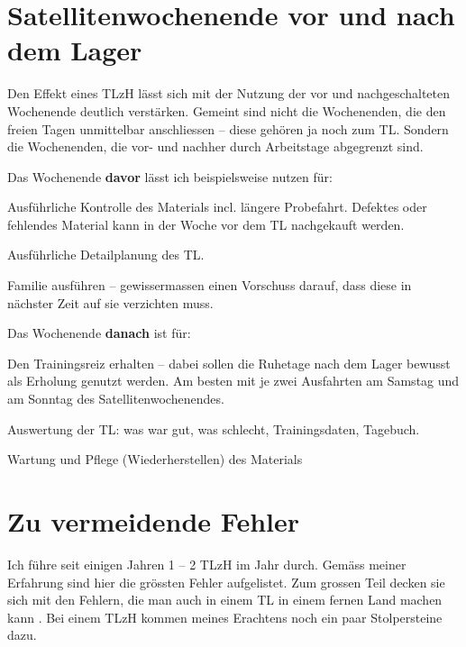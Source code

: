 \documentclass[a4paper,DIV13,BCOR0cm,draft=TRUE]{scrartcl}
\newcommand{\tlzh}{TLzH}
\begin{document}
\section{Satellitenwochenende vor und nach dem Lager}
\label{sec:satellitenwochenende}

Den Effekt eines \tlzh{} lässt sich mit der Nutzung der vor und nachgeschalteten Wochenende deutlich verstärken.
Gemeint sind nicht die Wochenenden, die den freien Tagen unmittelbar anschliessen -- diese gehören ja noch zum TL.
Sondern die Wochenenden, die vor- und nachher durch Arbeitstage abgegrenzt sind.

Das Wochenende \textbf{davor} lässt ich beispielsweise nutzen für:
\begin{itemize*}
  \item Ausführliche Kontrolle des Materials incl. längere Probefahrt.
    Defektes oder fehlendes Material kann in der Woche vor dem TL nachgekauft werden.
  \item Ausführliche Detailplanung des TL.
  \item Familie ausführen -- gewissermassen einen Vorschuss darauf, dass diese in nächster Zeit auf sie verzichten muss.
\end{itemize*}

Das Wochenende \textbf{danach} ist für:

\begin{itemize*}
  \item Den Trainingsreiz erhalten -- dabei sollen die Ruhetage nach dem Lager bewusst als Erholung genutzt werden.
    Am besten mit je zwei Ausfahrten am Samstag und am Sonntag des Satellitenwochenendes.
  \item Auswertung der TL: was war gut, was schlecht, Trainingsdaten, Tagebuch.
  \item Wartung und Pflege (Wiederherstellen) des Materials
\end{itemize*}


\section{Zu vermeidende Fehler}
\label{sec:zu-vermeidende-fehler}

Ich führe seit einigen Jahren 1 -- 2 \tlzh{} im Jahr durch.
Gemäss meiner Erfahrung sind hier die grössten Fehler aufgelistet.
Zum grossen Teil decken sie sich mit den Fehlern, die man auch in einem TL in einem fernen Land machen kann \cite{Beck2016trainingslagersuenden}.
Bei einem \tlzh{} kommen meines Erachtens noch ein paar Stolpersteine dazu.
\end{document}
